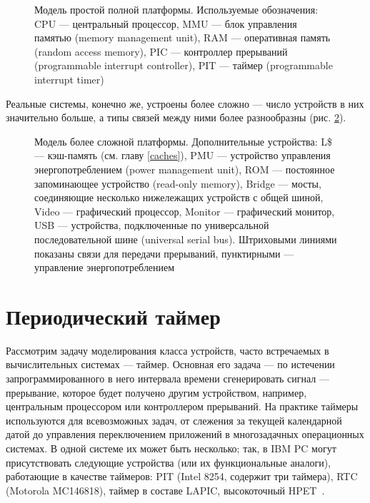 \begin{figure}[htp]
    \centering
    \caption[Модель простой полной платформы]{Модель простой полной платформы. Используемые обозначения: CPU — центральный процессор, MMU — блок управления памятью (\abbr memory management unit), RAM — оперативная память (\abbr random access memory), PIC — контроллер прерываний (\abbr programmable interrupt controller), PIT — таймер (\abbr programmable interrupt timer)}
    \label{fig:full-platform}
\end{figure}

Реальные системы, конечно же, устроены более сложно — число устройств в них значительно больше, а типы связей между ними более разнообразны (рис. \ref{fig:real-full-platform}).

\begin{figure}[htp]
    \centering
    \caption[Модель более сложной платформы]{Модель более сложной платформы. Дополнительные устройства: L\$ — кэш-память (см. главу \ref{caches}), PMU — устройство управления энергопотреблением (\abbr power management unit), ROM — постоянное запоминающее устройство (\abbr read-only memory), Bridge — мосты, соединяющие несколько нижележащих устройств с общей шиной, Video — графический процессор, Monitor — графический монитор, USB — устройства, подключенные по универсальной последовательной шине (\abbr universal serial bus). Штриховыми линиями показаны связи для передачи прерываний, пунктирными — управление энергопотреблением}
    \label{fig:real-full-platform}
\end{figure}

\section{Периодический таймер}

Рассмотрим задачу моделирования класса устройств, часто встречаемых в вычислительных системах — таймер. Основная его задача — по истечении запрограммированного в него интервала времени сгенерировать сигнал — прерывание, которое будет получено другим устройством, например, центральным процессором или контроллером прерываний. На практике таймеры используются для всевозможных задач, от слежения за текущей календарной датой до управления переключением приложений в многозадачных операционных системах. В одной системе их может быть несколько; так, в IBM PC могут присутствовать следующие устройства (или их функциональные аналоги), работающие в качестве таймеров: PIT (Intel 8254, содержит три таймера), RTC (Motorola MC146818), таймер в составе LAPIC, высокоточный HPET~\cite{hpet}.

